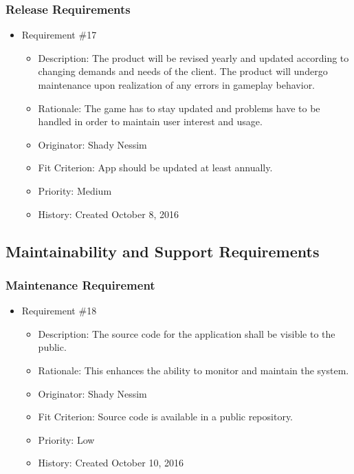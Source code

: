 \documentclass[12pt, titlepage]{article}
\begin{document}
\subsubsection{Release Requirements}
\begin{itemize} 

\item Requirement \#17
\begin{itemize} 
\item Description: The product will be revised yearly and updated according to changing demands and needs of the client. The product will undergo maintenance upon realization of any errors in gameplay behavior.
\item Rationale: The game has to stay updated and problems have to be handled in order to maintain user interest and usage.
\item Originator: Shady Nessim 
\item Fit Criterion: App should be updated at least annually.
\item Priority: Medium 
\item History: Created October 8, 2016
\end{itemize}

\end{itemize}

\subsection{Maintainability and Support Requirements}
\subsubsection{Maintenance Requirement}
\begin{itemize}

\item Requirement \#18
\begin{itemize} 
\item Description: The source code for the application shall be visible to the public. 
\item Rationale: This enhances the ability to monitor and maintain the system. 
\item Originator: Shady Nessim
\item Fit Criterion: Source code is available in a public repository. 
\item Priority: Low 
\item History: Created October 10, 2016
\end{itemize}

\end{itemize}
\end{document}
